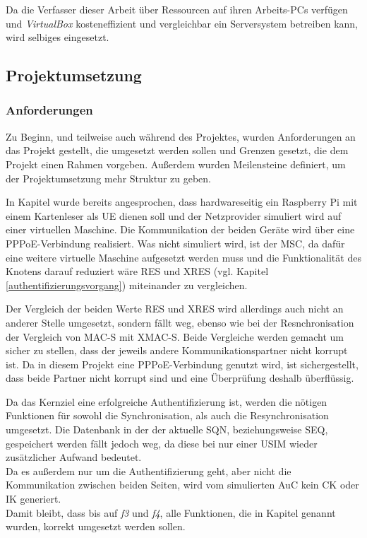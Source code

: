 Da die Verfasser dieser Arbeit über Ressourcen auf ihren Arbeits-PCs verfügen und \textit{VirtualBox}
kosteneffizient und vergleichbar ein Serversystem betreiben kann, wird selbiges eingesetzt.

\subsection{Projektumsetzung}
 \subsubsection{Anforderungen}
 Zu Beginn, und teilweise auch während des Projektes, wurden Anforderungen
 an das Projekt gestellt, die umgesetzt werden sollen und Grenzen gesetzt, die
 dem Projekt einen Rahmen vorgeben. Außerdem wurden Meilensteine definiert,
 um der Projektumsetzung mehr Struktur zu geben.
 
 In Kapitel  wurde bereits angesprochen, dass hardwareseitig
 ein Raspberry Pi mit einem Kartenleser als \ac{UE} dienen soll und der Netzprovider
 simuliert wird auf einer virtuellen Maschine. Die Kommunikation der beiden Geräte
 wird über eine \ac{PPPoE}-Verbindung realisiert. Was nicht simuliert wird, ist der
 \ac{MSC}, da dafür eine weitere virtuelle Maschine aufgesetzt werden muss und die
 Funktionalität des Knotens darauf reduziert wäre RES und XRES (vgl. Kapitel \ref{authentifizierungsvorgang})
 miteinander zu vergleichen.
 
 Der Vergleich der beiden Werte RES und XRES wird allerdings auch nicht an anderer
 Stelle umgesetzt, sondern fällt weg, ebenso wie bei der Resnchronisation der Vergleich
 von MAC-S mit XMAC-S. Beide Vergleiche werden gemacht um sicher zu stellen, dass
 der jeweils andere Kommunikationspartner nicht korrupt ist. Da in diesem Projekt eine
 PPPoE-Verbindung genutzt wird, ist sichergestellt, dass beide Partner nicht korrupt sind
 und eine Überprüfung deshalb überflüssig.
 
 Da das Kernziel eine erfolgreiche Authentifizierung ist, werden die nötigen Funktionen
 für sowohl die Synchronisation, als auch die Resynchronisation umgesetzt. Die Datenbank
 in der der aktuelle SQN, beziehungsweise SEQ, gespeichert werden fällt jedoch weg, da
 diese bei nur einer USIM wieder zusätzlicher Aufwand bedeutet. \\
 Da es außerdem nur um die Authentifizierung geht, aber nicht die Kommunikation zwischen
 beiden Seiten, wird vom simulierten AuC kein CK oder IK generiert. \\
 Damit bleibt, dass bis auf \emph{f3} und \emph{f4}, alle Funktionen, die in Kapitel 
 genannt wurden, korrekt umgesetzt werden sollen.
 
